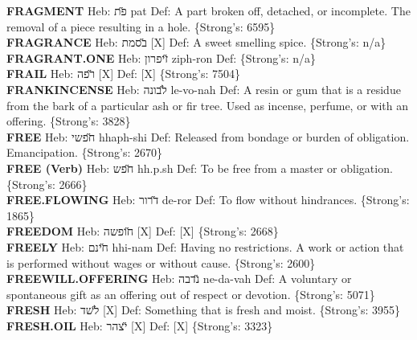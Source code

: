 {\textbf{FRAGMENT} Heb: {\large\H פת} pat Def: A part broken off, detached, or incomplete. The removal of a piece resulting in a hole. \{Strong's: 6595\}\hfill{}\\

\textbf{FRAGRANCE} Heb: {\large\H בסמת} {[}X{]} Def: A sweet smelling spice. \{Strong's: n/a\}\hfill{}\\

\textbf{FRAGRANT.ONE} Heb: {\large\H זיפרון} ziph-ron Def: \{Strong's: n/a\}\hfill{}\\

\textbf{FRAIL} Heb: {\large\H רפה} {[}X{]} Def: {[}X{]} \{Strong's: 7504\}\hfill{}\\

\textbf{FRANKINCENSE} Heb: {\large\H לבונה} le-vo-nah Def: A resin or gum that is a residue from the bark of a particular ash or fir tree. Used as incense, perfume, or with an offering. \{Strong's: 3828\}\hfill{}\\

\textbf{FREE} Heb: {\large\H חפשי} hhaph-shi Def: Released from bondage or burden of obligation. Emancipation. \{Strong's: 2670\}\hfill{}\\

\textbf{FREE (Verb)} Heb: {\large\H חפש} hh.p.sh Def: To be free from a master or obligation. \{Strong's: 2666\}\hfill{}\\

\textbf{FREE.FLOWING} Heb: {\large\H דרור} de-ror Def: To flow without hindrances. \{Strong's: 1865\}\hfill{}\\

\textbf{FREEDOM} Heb: {\large\H חופשה} {[}X{]} Def: {[}X{]} \{Strong's: 2668\}\hfill{}\\

\textbf{FREELY} Heb: {\large\H חינם} hhi-nam Def: Having no restrictions. A work or action that is performed without wages or without cause. \{Strong's: 2600\}\hfill{}\\

\textbf{FREEWILL.OFFERING} Heb: {\large\H נדבה} ne-da-vah Def: A voluntary or spontaneous gift as an offering out of respect or devotion. \{Strong's: 5071\}\hfill{}\\

\textbf{FRESH} Heb: {\large\H לשד} {[}X{]} Def: Something that is fresh and moist. \{Strong's: 3955\}\hfill{}\\

\textbf{FRESH.OIL} Heb: {\large\H יצהר} {[}X{]} Def: {[}X{]} \{Strong's: 3323\}\hfill{}\\

}
